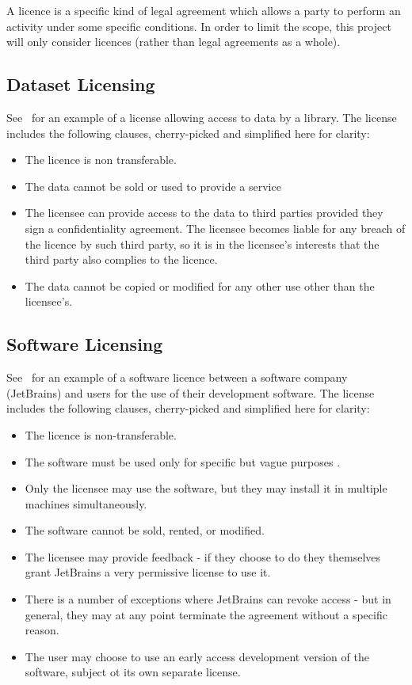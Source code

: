 A licence is a specific kind of legal agreement which allows a party to perform an activity under some specific
conditions\cite{licenseDefinition}.
In order to limit the scope, this project will only consider licences (rather than legal agreements as a whole).

\subsection{Dataset Licensing}\label{subsec:licensing:dataset}
See~\cite{seismicDataLicence} for an example of a license allowing access to data by a library.
The license includes the following clauses, cherry-picked and simplified here for clarity:
\begin{itemize}
    \item The licence is non transferable.
    \item The data cannot be sold or used to provide a service
    \item The licensee can provide access to the data to third parties provided they sign a confidentiality agreement.
    The licensee becomes liable for any breach of the licence by such third party, so it is in the licensee's interests
    that the third party also complies to the licence.
    \item The data cannot be copied or modified for any other use other than the licensee's.
\end{itemize}

\subsection{Software Licensing}\label{subsec:licensing:software}
See~\cite{jetbrainsEduLicence} for an example of a software licence between a software company (JetBrains) and users for
the use of their development software.
The license includes the following clauses, cherry-picked and simplified here for clarity:
\begin{itemize}
    \item The licence is non-transferable.
    \item The software must be used only for specific but vague purposes \textcite[for non-commercial, educational purposes
    only]{jetbrainsEduLicence}.
    \item Only the licensee may use the software, but they may install it in multiple machines simultaneously.
    \item The software cannot be sold, rented, or modified.
    \item The licensee may provide feedback - if they choose to do they themselves grant JetBrains a very permissive
    license to use it.
    \item There is a number of exceptions where JetBrains can revoke access - but in general, they may at any point
    terminate the agreement without a specific reason.
    \item The user may choose to use an early access development version of the software, subject ot its own separate
    license.
\end{itemize}

